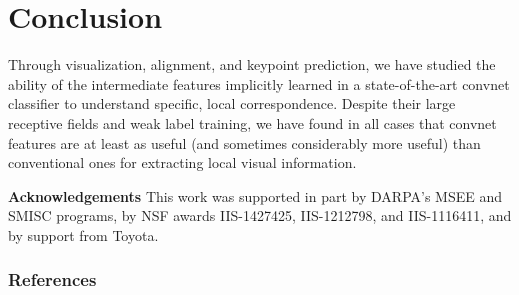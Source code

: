 \documentclass{article} \usepackage{nips14submit_e,times}
\begin{document}
\section{Conclusion}

Through visualization, alignment, and keypoint prediction, we have studied the
ability of the intermediate features implicitly learned in a state-of-the-art
convnet classifier to understand specific, local correspondence.
Despite their large receptive fields and weak label training, we have found in
all cases that convnet features are at least as useful (and sometimes
considerably more useful) than conventional ones for extracting local
visual information.


{\small
\textbf{Acknowledgements}\hspace{1ex} This work was supported in part by DARPA's MSEE and SMISC programs, by NSF awards
IIS-1427425, IIS-1212798, and IIS-1116411, and by support from Toyota.
}

\subsubsection*{References}

\begingroup
\renewcommand{\section}[2]{}
\small{


}
\endgroup
\end{document}
